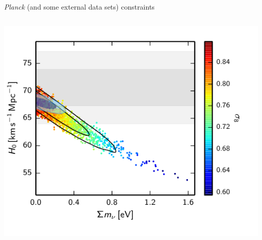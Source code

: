 \documentclass{beamer}
\begin{document}
\begin{frame}{\textit{Planck} (and some external data sets) constraints}
\begin{columns}
\begin{column}{0.45\textwidth}
{\includegraphics[scale=0.65]{./mnu-H0.pdf}} 
\end{column}
\end{columns}
\begin{center}
\end{center}

\end{frame}
\end{document}
